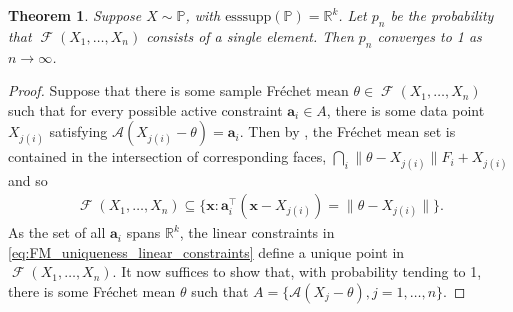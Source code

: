 \documentclass[10pt]{article}
\newtheorem{theorem}{Theorem}[section]
\theoremstyle{definition}
\theoremstyle{remark}
\newcommand{\R}{\mathbb{R}}
\newcommand{\T}{\intercal}
\newcommand{\esssupp}{\mathrm{esssupp}}
\newcommand{\sample}{ X_1,\dots, X_n}
\DeclareMathOperator{\FMset}{\mathcal{F}}
\renewcommand{\vec}[1]{\mathbf{#1}}
\newcommand{\mb}[1]{\mathbb #1}
\newcommand{\A}{\mathcal{A}}
\begin{document}
	\begin{theorem}\label{thm:uniqueness_prob_convergence}
		Suppose $X \sim \mb P$, with $\esssupp(\mb P) = \R^k$. Let $p_n$ be the probability that $\FMset(X_1,\dots,X_n)$ consists of a single element. Then $p_n$ converges to 1 as $n \rightarrow \infty$.
	\end{theorem}
	\begin{proof}
		Suppose that there is some sample Fr\'echet mean $\theta \in \FMset(\sample)$ such that for every possible active constraint $\vec a_i \in A$, there is some data point $X_{j(i)}$ satisfying $\A(X_{j(i)}-\theta) = \vec a_i$. Then by , the Fr\'echet mean set is contained in the intersection of corresponding faces, $\bigcap_i \|\theta-X_{j(i)}\| F_i+X_{j(i)}$ and so
		\begin{align}
			\FMset(X_1,\dots,X_n) \subseteq \{ \vec x: \vec a_i^{\T}(\vec x-X_{j(i)}) = \|\theta-X_{j(i)}\| \} \label{eq:FM_uniqueness_linear_constraints}.
		\end{align}
		As the set of all $\vec a_i$ spans $\R^k$, the linear constraints in \ref{eq:FM_uniqueness_linear_constraints} define a unique point in $\FMset(X_1, \dots, X_n)$. It now suffices to show that, with probability tending to 1, there is some Fr\'echet mean $\theta$ such that $A = \{ \A(X_j - \theta), j=1,\dots,n \}$.
		

\end{proof}
\end{document}
